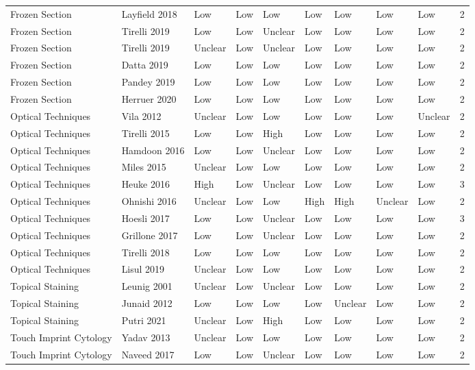 \begin{table}[ht]
\begin{tabular}{llllllllll}
  Frozen Section & Layfield 2018 & Low & Low & Low & Low & Low & Low & Low & 2 \\ 
  Frozen Section & Tirelli 2019 & Low & Low & Unclear & Low & Low & Low & Low & 2 \\ 
  Frozen Section & Tirelli 2019 & Unclear & Low & Unclear & Low & Low & Low & Low & 2 \\ 
  Frozen Section & Datta 2019 & Low & Low & Low & Low & Low & Low & Low & 2 \\ 
  Frozen Section & Pandey 2019 & Low & Low & Low & Low & Low & Low & Low & 2 \\ 
  Frozen Section & Herruer 2020 & Low & Low & Low & Low & Low & Low & Low & 2 \\ 
  Optical Techniques & Vila 2012 & Unclear & Low & Low & Low & Low & Low & Unclear & 2 \\ 
  Optical Techniques & Tirelli 2015 & Low & Low & High & Low & Low & Low & Low & 2 \\ 
  Optical Techniques & Hamdoon 2016 & Low & Low & Unclear & Low & Low & Low & Low & 2 \\ 
  Optical Techniques & Miles 2015 & Unclear & Low & Low & Low & Low & Low & Low & 2 \\ 
  Optical Techniques & Heuke 2016 & High & Low & Unclear & Low & Low & Low & Low & 3 \\ 
  Optical Techniques & Ohnishi 2016 & Unclear & Low & Low & High & High & Unclear & Low & 2 \\ 
  Optical Techniques & Hoesli 2017 & Low & Low & Unclear & Low & Low & Low & Low & 3 \\ 
  Optical Techniques & Grillone 2017 & Low & Low & Unclear & Low & Low & Low & Low & 2 \\ 
  Optical Techniques & Tirelli 2018 & Low & Low & Low & Low & Low & Low & Low & 2 \\ 
  Optical Techniques & Lisul 2019 & Unclear & Low & Low & Low & Low & Low & Low & 2 \\ 
  Topical Staining & Leunig 2001 & Unclear & Low & Unclear & Low & Low & Low & Low & 2 \\ 
  Topical Staining & Junaid 2012 & Low & Low & Low & Low & Unclear & Low & Low & 2 \\ 
  Topical Staining & Putri 2021 & Unclear & Low & High & Low & Low & Low & Low & 2 \\ 
  Touch Imprint Cytology & Yadav 2013 & Unclear & Low & Low & Low & Low & Low & Low & 2 \\ 
  Touch Imprint Cytology & Naveed 2017 & Low & Low & Unclear & Low & Low & Low & Low & 2 \\ 

\end{tabular}
\end{table}
